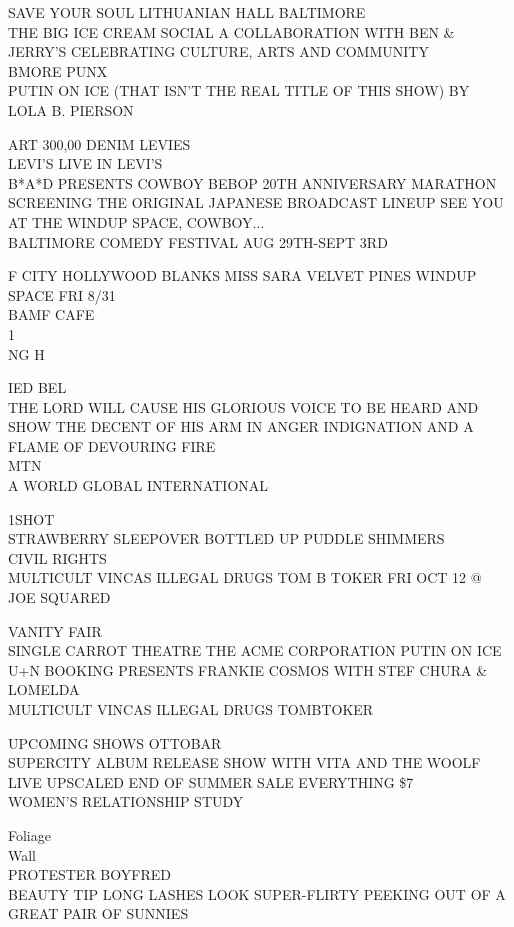 \documentclass[10pt,letterpaper]{article}
\begin{document}
SAVE YOUR SOUL LITHUANIAN HALL BALTIMORE\\
THE BIG ICE CREAM SOCIAL A COLLABORATION WITH BEN \& JERRY'S CELEBRATING CULTURE, ARTS AND COMMUNITY\\
BMORE PUNX\\
PUTIN ON ICE (THAT ISN'T THE REAL TITLE OF THIS SHOW) BY LOLA B. PIERSON

ART 300,00 DENIM LEVIES\\
LEVI'S LIVE IN LEVI'S\\
B*A*D PRESENTS COWBOY BEBOP 20TH ANNIVERSARY MARATHON SCREENING THE ORIGINAL JAPANESE BROADCAST LINEUP SEE YOU AT THE WINDUP SPACE, COWBOY...\\
BALTIMORE COMEDY FESTIVAL AUG 29TH{-}SEPT 3RD

F CITY HOLLYWOOD BLANKS MISS SARA VELVET PINES WINDUP SPACE FRI 8/31\\
BAMF CAFE\\
1\\
NG H

IED BEL\\
THE LORD WILL CAUSE HIS GLORIOUS VOICE TO BE HEARD AND SHOW THE DECENT OF HIS ARM IN ANGER INDIGNATION AND A FLAME OF DEVOURING FIRE\\
MTN\\
A WORLD GLOBAL INTERNATIONAL

1SHOT\\
STRAWBERRY SLEEPOVER BOTTLED UP PUDDLE SHIMMERS\\
CIVIL RIGHTS\\
MULTICULT VINCAS ILLEGAL DRUGS TOM B TOKER FRI OCT 12 @ JOE SQUARED

VANITY FAIR\\
SINGLE CARROT THEATRE THE ACME CORPORATION PUTIN ON ICE\\
U+N BOOKING PRESENTS FRANKIE COSMOS WITH STEF CHURA \& LOMELDA\\
MULTICULT VINCAS ILLEGAL DRUGS TOMBTOKER

UPCOMING SHOWS OTTOBAR\\
SUPERCITY ALBUM RELEASE SHOW WITH VITA AND THE WOOLF\\
LIVE UPSCALED END OF SUMMER SALE EVERYTHING \$7\\
WOMEN'S RELATIONSHIP STUDY

Foliage\\
Wall\\
PROTESTER BOYFRED\\
BEAUTY TIP LONG LASHES LOOK SUPER{-}FLIRTY PEEKING OUT OF A GREAT PAIR OF SUNNIES
\end{document}
